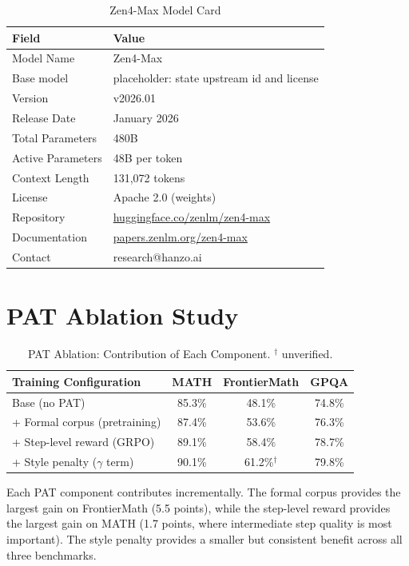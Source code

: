 \documentclass[11pt,a4paper]{article}
\begin{document}
\begin{table}[H]
\centering
\begin{tabular}{ll}
\toprule
\textbf{Field} & \textbf{Value} \\
\midrule
Model Name       & Zen4-Max \\
Base model       & placeholder: state upstream id and license \\
Version          & v2026.01 \\
Release Date     & January 2026 \\
Total Parameters & 480B \\
Active Parameters& 48B per token \\
Context Length   & 131,072 tokens \\
License          & Apache 2.0 (weights) \\
Repository       & \href{https://huggingface.co/zenlm/zen4-max}{huggingface.co/zenlm/zen4-max} \\
Documentation    & \href{https://papers.zenlm.org/zen4-max}{papers.zenlm.org/zen4-max} \\
Contact          & research@hanzo.ai \\
\bottomrule
\end{tabular}
\caption{Zen4-Max Model Card}
\end{table}

\section{PAT Ablation Study}

\begin{table}[H]
\centering
\begin{tabular}{lccc}
\toprule
\textbf{Training Configuration} & \textbf{MATH} & \textbf{FrontierMath} & \textbf{GPQA} \\
\midrule
Base (no PAT)                   & 85.3\% & 48.1\% & 74.8\% \\
+ Formal corpus (pretraining)   & 87.4\% & 53.6\% & 76.3\% \\
+ Step-level reward (GRPO)      & 89.1\% & 58.4\% & 78.7\% \\
+ Style penalty ($\gamma$ term) & 90.1\% & 61.2\%$^{\dagger}$ & 79.8\% \\
\bottomrule
\end{tabular}
\caption{PAT Ablation: Contribution of Each Component. $^{\dagger}$ unverified.}
\end{table}

Each PAT component contributes incrementally. The formal corpus provides the largest
gain on FrontierMath (5.5 points), while the step-level reward provides the largest
gain on MATH (1.7 points, where intermediate step quality is most important).
The style penalty provides a smaller but consistent benefit across all three benchmarks.
\end{document}
